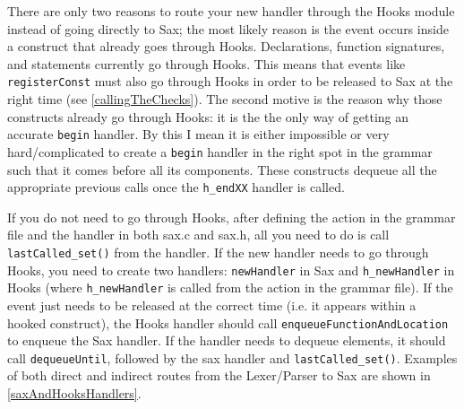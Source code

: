 \documentclass[12pt]{report}
\begin{document}
There are only two reasons to route your new handler through the Hooks module instead of going 
directly to Sax; the most likely reason is the event occurs inside a construct that already goes through 
Hooks. Declarations, function signatures, and statements currently go through Hooks. This means that 
events like \lstinline{registerConst} must also go through Hooks in order to be released to Sax at the right 
time (see \autoref{callingTheChecks}). The second motive is the reason why those constructs 
already go through Hooks:  it is the the only way of getting an accurate \lstinline{begin} handler. By this I 
mean it is either impossible or very hard\slash complicated to create a \lstinline{begin} handler in the 
right spot in the grammar such that it comes before all its components. These constructs dequeue all the 
appropriate previous calls once the \lstinline{h_endXX} handler is called.

If you do not need to go through Hooks, after defining the action in the grammar file and the handler in 
both sax.c and sax.h, all you need to do is call \lstinline{lastCalled_set()} from the handler. If the new 
handler needs to go through Hooks, you need to create two handlers: \lstinline{newHandler} in Sax and 
\lstinline{h_newHandler} in Hooks (where \lstinline{h_newHandler} is called from the action in the 
grammar file). If the event just needs to be released at the correct time (i.e. it appears within a hooked 
construct), the Hooks handler should call \lstinline{enqueueFunctionAndLocation} to enqueue the Sax 
handler. If the handler needs to dequeue elements, it should call \lstinline{dequeueUntil}, followed by the 
sax handler and \lstinline{lastCalled_set()}. Examples of both direct and indirect routes from the 
Lexer\slash Parser to Sax are shown in \autoref{saxAndHooksHandlers}.
\end{document}
